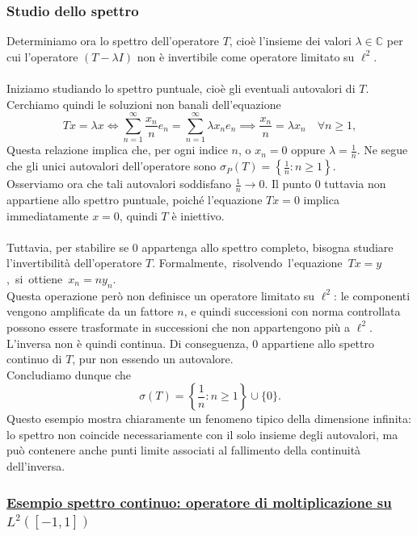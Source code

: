\documentclass[a4paper,12pt]{report}
\begin{document}
\subsubsection{Studio dello spettro}

Determiniamo ora lo spettro dell’operatore $T$, cioè l’insieme dei valori $\lambda \in \mathbb{C}$ per cui l’operatore $(T-\lambda I)$ non è invertibile come operatore limitato su $\ell^2$.
\\
\\Iniziamo studiando lo spettro puntuale, cioè gli eventuali autovalori di $T$. Cerchiamo quindi le soluzioni non banali dell’equazione
\[
Tx=\lambda x\iff 
\sum_{n=1}^\infty\frac{x_n}{n}e_n
=
\sum_{n=1}^\infty\lambda x_n e_n\implies 
\frac{x_n}{n}=\lambda x_n
\quad \forall n\ge1,
\]
Questa relazione implica che, per ogni indice $n$, o $x_n=0$ oppure $\lambda=\frac1n$.
Ne segue che gli unici autovalori dell’operatore sono
$\sigma_P(T)=\left\{\frac1n : n\ge1\right\}$.
\\Osserviamo ora che tali autovalori soddisfano $\frac1n \to 0$. Il punto $0$ tuttavia non appartiene allo spettro puntuale, poiché l’equazione $Tx=0$ implica immediatamente $x=0$, quindi $T$ è iniettivo.
\\
\\Tuttavia, per stabilire se $0$ appartenga allo spettro completo, bisogna studiare l’invertibilità dell’operatore $T$. \mbox{Formalmente, risolvendo l’equazione $Tx=y$, si ottiene $x_n = n y_n$}.
\\Questa operazione però non definisce un operatore limitato su $\ell^2$: le componenti vengono amplificate da un fattore $n$, e quindi successioni con norma controllata possono essere trasformate in successioni che non appartengono più a $\ell^2$. L’inversa non è quindi continua. Di conseguenza, $0$ appartiene allo spettro continuo di $T$, pur non essendo un autovalore. \\Concludiamo dunque che
\[
\sigma(T)=\left\{\frac1n : n\ge1\right\}\cup\{0\}.
\]
Questo esempio mostra chiaramente un fenomeno tipico della dimensione infinita: lo spettro non coincide necessariamente con il solo insieme degli autovalori, ma può contenere anche punti limite associati al fallimento della continuità dell’inversa.

\newpage

\subsubsection{\underline{Esempio spettro continuo: operatore di moltiplicazione su $L^2([-1,1])$}}
\end{document}
